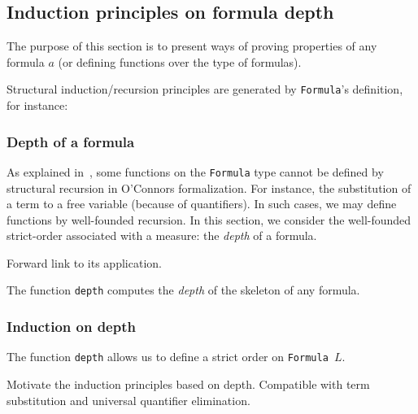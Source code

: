 \subsection{Induction principles on formula depth}




The purpose of this section is to present ways of proving 
properties of any formula $a$ (or defining functions over the type of formulas).

Structural induction/recursion principles are generated by 
\texttt{Formula}'s definition, for instance:








\subsubsection{Depth of a formula}
As explained in~\cite{OConnor05}, some functions on the \texttt{Formula} type cannot be defined by structural recursion in 
O'Connors formalization. For instance, the substitution of a term to a free variable (because of quantifiers). 
In such cases, we may define functions by well-founded recursion. In this section, we consider the well-founded strict-order associated with a measure: the \emph{depth} of a formula.

\begin{todo}
Forward link to its application.
\end{todo}


The function \texttt{depth} computes the \emph{depth} of the 
 skeleton of any formula.


\subsubsection{Induction on depth}

The function \texttt{depth} allows us to define a strict order on 
\texttt{Formula $L$}.



\begin{todo}
Motivate the induction principles based on depth. Compatible with term substitution and universal quantifier elimination.
\end{todo}



